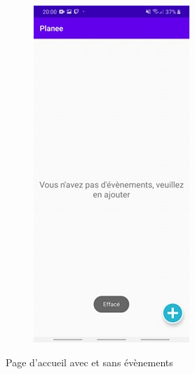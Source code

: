 \documentclass[12pt,a4paper]{report}
\begin{document}
\begin{flushleft}
\begin{figure}[!h]
\begin{subfigure}[b]{0.3\textwidth}
    \end{subfigure}
    \begin{subfigure}[b]{0.3\textwidth}
        \includegraphics[width=\textwidth]{HomeNoEvent}
    \end{subfigure}
    \caption{Page d'accueil avec et sans évènements}
\end{figure}
\end{flushleft}
\end{document}
